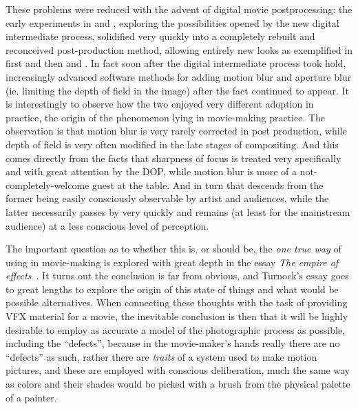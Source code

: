 These problems were reduced with the advent of digital movie postprocessing:
the early experiments in \cite{pleasantville98} and \cite{whatdreams98}, exploring the possibilities
opened by the new \gls{digital intermediate} process, solidified very quickly into a completely rebuilt
and reconceived post-production method, allowing entirely new looks as exemplified in \cite{brother2000}
first and then \cite{amelie2001} and \cite{moulin2001}. In fact soon after the digital intermediate process
took hold, increasingly advanced software methods for adding motion blur and aperture blur 
(ie. limiting the depth of field in the image) after the fact continued to appear.
It is interestingly to observe how the two enjoyed very different adoption in practice, the origin
of the phenomenon lying in movie-making practice. The observation is that motion blur is very
rarely corrected in post production, while depth of field is very often modified in the late
stages of compositing. And this comes directly from the facts that sharpness of focus is treated 
very specifically and with great attention by the \gls{DOP}, while  motion blur is more of a 
not-completely-welcome guest at the table. And in turn that descends from the former being
easily consciously observable by artist and audiences, while the latter necessarily 
passes by very quickly and remains (at least for the mainstream audience) at a less conscious
level of perception.



The important question as to whether this is, or should be, the \emph{one true way} of using  in 
movie-making is explored with great depth in the essay \emph{The empire of effects}~\cite{turnock22}. 
It turns out the conclusion is far from obvious, and Turnock's essay goes to great lengths to explore the
origin of this state of things and what would be possible alternatives.
When connecting these thoughts with the task of providing \gls{VFX} material for a movie,
the inevitable conclusion is then that it will be highly desirable to employ as accurate a model of the 
photographic process as possible, including the ``defects'', because in the movie-maker's hands really there
are no ``defects'' as such, rather there are \emph{traits} of a system used to make motion pictures,
and these are employed with conscious deliberation, much the same way as colors and their shades 
would be picked with a brush from the physical palette of a painter.




